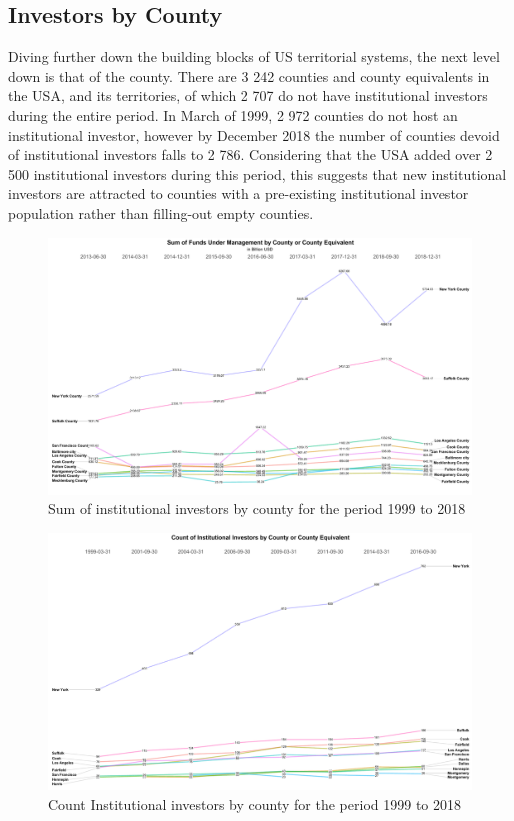\subsection{Investors by County}
\label{investorsbycounty}
Diving further down the building blocks of US territorial systems, the next level down is that of the county. There are 3 242 counties and county equivalents in the USA, and its territories,  of which 2 707 do not have institutional investors during the entire period. In March of 1999, 2 972 counties do not host an institutional investor, however by December 2018 the number of counties devoid of institutional investors falls to 2 786.  Considering that the USA added over 2 500 institutional investors during this period, this suggests that new institutional investors are attracted to counties with a pre-existing institutional investor population rather than filling-out empty counties.  



\begin{figure}
	\centering
	\includegraphics[width=1\linewidth]{Figures/ChapterIII/Sum_by_County}
	\caption[Sum of Institutional Investors by County]{Sum of institutional investors by county for the period 1999 to 2018}
	\label{fig:sumbycounty}
\end{figure}


\begin{figure}
	\centering
	\includegraphics[width=1\linewidth]{Figures/ChapterIII/Count_by_County}
	\caption[Count  of Institutional Investors by County]{Count Institutional investors by county for the period 1999 to 2018}
	\label{fig:countbycounty}
\end{figure}

